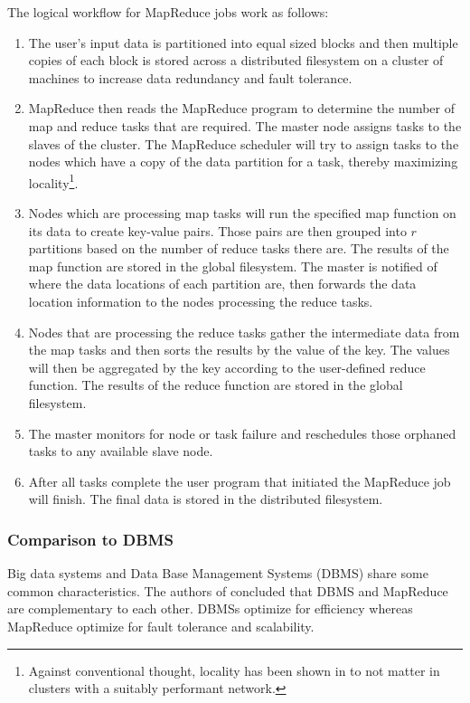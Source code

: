 \documentclass[12pt]{article}
\begin{document}
The logical workflow for MapReduce jobs work as follows:
\begin{enumerate}
    \item The user's input data is partitioned into equal sized blocks and then multiple copies of each block is stored across a distributed filesystem on a cluster of machines to increase data redundancy and fault tolerance.
    \item MapReduce then reads the MapReduce program to determine the number of map and reduce tasks that are required. The master node assigns tasks to the slaves of the cluster. The MapReduce scheduler will try to assign tasks to the nodes which have a copy of the data partition for a task, thereby maximizing locality\footnote{Against conventional thought, locality has been shown in \cite{ousterhout2015making} to not matter in clusters with a suitably performant network.}.
    \item Nodes which are processing map tasks will run the specified map function on its data to create key-value pairs. Those pairs are then grouped into $r$ partitions based on the number of reduce tasks there are. The results of the map function are stored in the global filesystem. The master is notified of where the data locations of each partition are, then forwards the data location information to the nodes processing the reduce tasks.
    \item Nodes that are processing the reduce tasks gather the intermediate data from the map tasks and then sorts the results by the value of the key. The values will then be aggregated by the key according to the user-defined reduce function. The results of the reduce function are stored in the global filesystem.
    \item The master monitors for node or task failure and reschedules those orphaned tasks to any available slave node.
    \item After all tasks complete the user program that initiated the MapReduce job will finish. The final data is stored in the distributed filesystem.
\end{enumerate}


\subsubsection{Comparison to DBMS}

Big data systems and Data Base Management Systems (DBMS) share some common characteristics. The authors of \cite{stonebreaker2010mapreduce} concluded that DBMS and MapReduce are complementary to each other. DBMSs optimize for efficiency whereas MapReduce optimize for fault tolerance and scalability.
\end{document}
